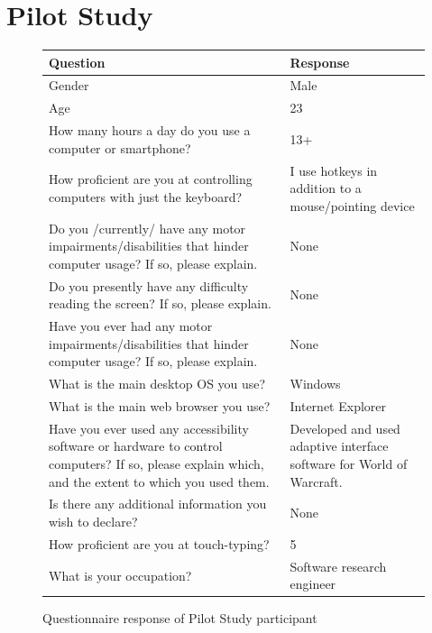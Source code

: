\documentclass[a4paper, 12pt]{report}
\begin{document}
\clearpage
{}
{}
\appendix
\chapter{Pilot Study}

\begin{figure}[ht]
\renewcommand{\arraystretch}{1.5}

\begin{tabularx}{\textwidth}{X|X}
\hline\hline %
Question & Response \\ [0.5ex] %
\hline
Gender	&	Male	\\
Age	&	23	\\
How many hours a day do you use a computer or smartphone?	&	13+	\\
How proficient are you at controlling computers with just the keyboard?	&	I use hotkeys in addition to a mouse/pointing device	\\
Do you /currently/ have any motor impairments/disabilities that hinder computer usage? If so, please explain.	&	None	\\
Do you presently have any difficulty reading the screen? If so, please explain.	&	None	\\
Have you ever had any motor impairments/disabilities that hinder computer usage? If so, please explain.	&	None	\\
What is the main desktop OS you use?	&	Windows	\\
What is the main web browser you use?	&	Internet Explorer	\\
Have you ever used any accessibility software or hardware to control computers? If so, please explain which, and the extent to which you used them.	&	Developed and used adaptive interface software for World of Warcraft.	\\
Is there any additional information you wish to declare?	&	None	\\
How proficient are you at touch-typing?	&	5	\\
What is your occupation?	&	Software research engineer	\\ [1ex] %
\hline %
\end{tabularx}
\caption{Questionnaire response of Pilot Study participant}
\label{fig:partic_pilotpre}
\end{figure}
\end{document}
